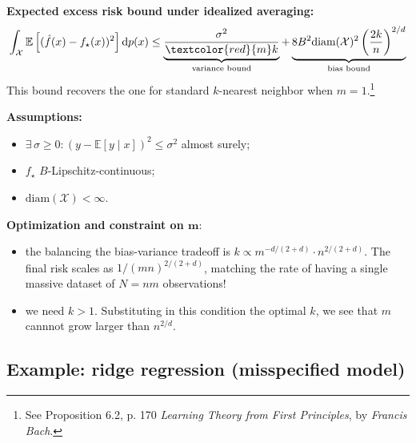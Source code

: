 \documentclass[
11pt,notheorems,hyperref={pdfauthor=whatever}
]{beamer}
\begin{document}
\begin{frame}
    \textbf{Expected excess risk bound under idealized averaging:}
    \[
        \int_{\mathcal{X}}\mathbb{E}\left[(\hat{f}(x)-f_\star(x))^2\right]\mathrm{d}p(x) \leq \underbrace{\frac{\sigma^2}{\textcolor{red}{m}k}}_{\text{variance bound}} + \underbrace{8B^2\text{diam}(\mathcal{X})^2\left(\frac{2k}{n}\right)^{2/d}}_{\text{bias bound}}
    \]
    This bound recovers the one for standard \(k\)-nearest neighbor when \(m=1\).\footnote{See Proposition 6.2, p. 170 \textit{Learning Theory from First Principles}, by \textit{Francis Bach}.}
    
    \vspace{0.5em}
    \textbf{Assumptions:} 
    \begin{itemize}
        \item \(\exists\,\sigma\geq0:(y-\mathbb{E}[y\mid x])^2\leq\sigma^2\) almost surely;
        \item \(f_\star\) \(B\)-Lipschitz-continuous;
        \item \(\text{diam}(\mathcal{X})<\infty\).
    \end{itemize}
    

    \vspace{0.5em}
    \textbf{Optimization and constraint on \(\boldsymbol{m}:\)}
    \begin{itemize}
        \item the  balancing the bias-variance tradeoff is \(k \propto m^{-d/(2+d)} \cdot n^{2/(2+d)}\). The final risk scales as \(1/(mn)^{2/(2+d)}\), matching the rate of having a single massive dataset of \(N=nm\) observations!
        \item we need \(k>1\). Substituting in this condition the optimal \(k\), we see that \(m\) cannnot grow larger than \(n^{2/d}\).
    \end{itemize}
\end{frame}

\subsection{Example: ridge regression (misspecified model)}
\end{document}
